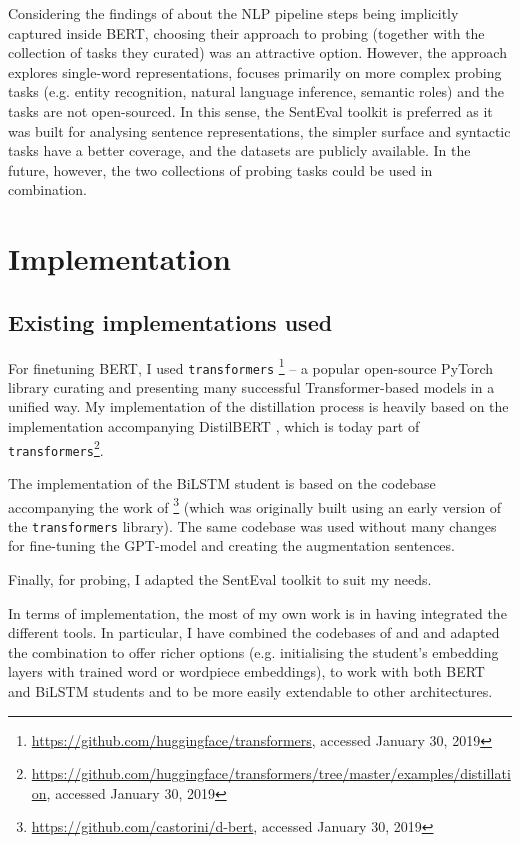 \documentclass[bsc,frontabs,twoside,singlespacing,parskip,deptreport]{infthesis}
\begin{document}
{{    Considering the findings of \citet{Tenney_2019b} about the NLP pipeline steps being implicitly captured inside BERT, choosing their approach to probing (together with the collection of tasks they curated) was an attractive option. However, the approach explores single-word representations, focuses primarily on more complex probing tasks (e.g. entity recognition, natural language inference, semantic roles) and the tasks are not open-sourced. In this sense, the SentEval toolkit is preferred as it was built for analysing sentence representations, the simpler surface and syntactic tasks have a better coverage, and the datasets are publicly available. In the future, however, the two collections of probing tasks could be used in combination.
  }
}

\chapter{Implementation}{
  \label{chap:implementation}
  \section{Existing implementations used}{
    For finetuning BERT, I used \verb|transformers| \citep{Wolf_2019}\footnote{\url{https://github.com/huggingface/transformers}, accessed January 30, 2019} -- a popular open-source PyTorch library curating and presenting many successful Transformer-based models in a unified way.
    My implementation of the distillation process is heavily based on the implementation accompanying DistilBERT \citep{Sanh_2019}, which is today part of \verb|transformers|\footnote{\url{https://github.com/huggingface/transformers/tree/master/examples/distillation}, accessed January 30, 2019}.

    The implementation of the BiLSTM student is based on the codebase accompanying the work of \citet{Tang_2019b}\footnote{\url{https://github.com/castorini/d-bert}, accessed January 30, 2019} (which was originally built using an early version of the \verb|transformers| library). The same codebase was used without many changes for fine-tuning the GPT-model and creating the augmentation sentences.

    Finally, for probing, I adapted the SentEval toolkit \citep{SentEval-paper} to suit my needs.

    In terms of implementation, the most of my own work is in having integrated the different tools. In particular, I have combined the codebases of \citet{Sanh_2019} and \citet{Tang_2019b} and adapted the combination to offer richer options (e.g. initialising the student's embedding layers with trained word or wordpiece embeddings), to work with both BERT and BiLSTM students and to be more easily extendable to other architectures.
  }
}
\end{document}
